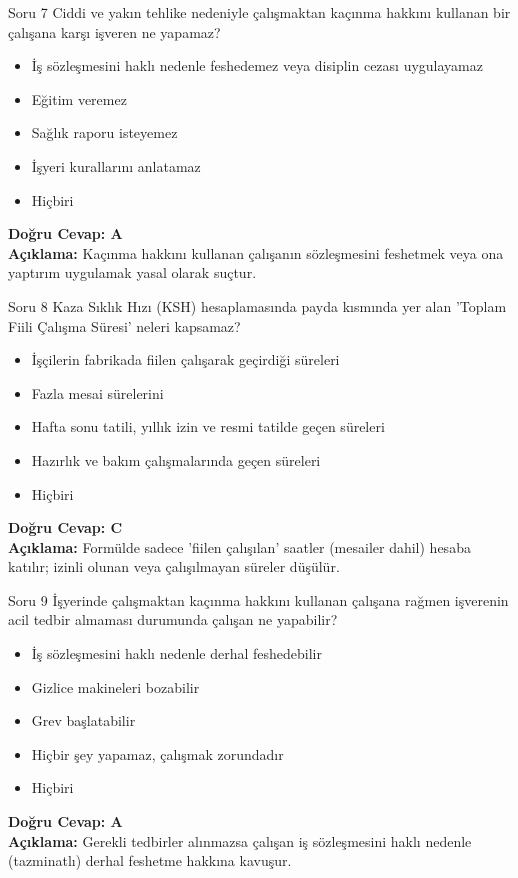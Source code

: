 \documentclass[12pt,a4paper]{article}
\begin{document}
\begin{testcard}{Soru 7}
    Ciddi ve yakın tehlike nedeniyle çalışmaktan kaçınma hakkını kullanan bir çalışana karşı işveren ne yapamaz?
    \begin{itemize}
        \item[A)] İş sözleşmesini haklı nedenle feshedemez veya disiplin cezası uygulayamaz
        \item[B)] Eğitim veremez
        \item[C)] Sağlık raporu isteyemez
        \item[D)] İşyeri kurallarını anlatamaz
        \item[E)] Hiçbiri
    \end{itemize}
    \tcblower
    \textbf{Doğru Cevap: A} \\
    \textbf{Açıklama:} Kaçınma hakkını kullanan çalışanın sözleşmesini feshetmek veya ona yaptırım uygulamak yasal olarak suçtur.
\end{testcard}

\begin{testcard}{Soru 8}
    Kaza Sıklık Hızı (KSH) hesaplamasında payda kısmında yer alan 'Toplam Fiili Çalışma Süresi' neleri kapsamaz?
    \begin{itemize}
        \item[A)] İşçilerin fabrikada fiilen çalışarak geçirdiği süreleri
        \item[B)] Fazla mesai sürelerini
        \item[C)] Hafta sonu tatili, yıllık izin ve resmi tatilde geçen süreleri
        \item[D)] Hazırlık ve bakım çalışmalarında geçen süreleri
        \item[E)] Hiçbiri
    \end{itemize}
    \tcblower
    \textbf{Doğru Cevap: C} \\
    \textbf{Açıklama:} Formülde sadece 'fiilen çalışılan' saatler (mesailer dahil) hesaba katılır; izinli olunan veya çalışılmayan süreler düşülür.
\end{testcard}

\begin{testcard}{Soru 9}
    İşyerinde çalışmaktan kaçınma hakkını kullanan çalışana rağmen işverenin acil tedbir almaması durumunda çalışan ne yapabilir?
    \begin{itemize}
        \item[A)] İş sözleşmesini haklı nedenle derhal feshedebilir
        \item[B)] Gizlice makineleri bozabilir
        \item[C)] Grev başlatabilir
        \item[D)] Hiçbir şey yapamaz, çalışmak zorundadır
        \item[E)] Hiçbiri
    \end{itemize}
    \tcblower
    \textbf{Doğru Cevap: A} \\
    \textbf{Açıklama:} Gerekli tedbirler alınmazsa çalışan iş sözleşmesini haklı nedenle (tazminatlı) derhal feshetme hakkına kavuşur.
\end{testcard}
\end{document}
